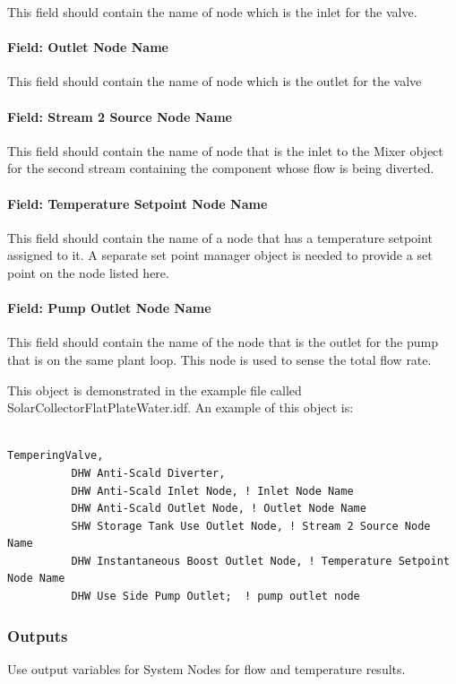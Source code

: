 This field should contain the name of node which is the inlet for the valve.

\paragraph{Field: Outlet Node Name}\label{field-outlet-node-name-004}

This field should contain the name of node which is the outlet for the valve

\paragraph{Field: Stream 2 Source Node Name}\label{field-stream-2-source-node-name}

This field should contain the name of node that is the inlet to the Mixer object for the second stream containing the component whose flow is being diverted.

\paragraph{Field: Temperature Setpoint Node Name}\label{field-temperature-setpoint-node-name-000}

This field should contain the name of a node that has a temperature setpoint assigned to it. A separate set point manager object is needed to provide a set point on the node listed here.

\paragraph{Field: Pump Outlet Node Name}\label{field-pump-outlet-node-name}

This field should contain the name of the node that is the outlet for the pump that is on the same plant loop. This node is used to sense the total flow rate.

This object is demonstrated in the example file called SolarCollectorFlatPlateWater.idf. An example of this object is:

\begin{lstlisting}

TemperingValve,
          DHW Anti-Scald Diverter,
          DHW Anti-Scald Inlet Node, ! Inlet Node Name
          DHW Anti-Scald Outlet Node, ! Outlet Node Name
          SHW Storage Tank Use Outlet Node, ! Stream 2 Source Node Name
          DHW Instantaneous Boost Outlet Node, ! Temperature Setpoint Node Name
          DHW Use Side Pump Outlet;  ! pump outlet node
\end{lstlisting}

\subsubsection{Outputs}\label{outputs-023}

Use output variables for System Nodes for flow and temperature results.